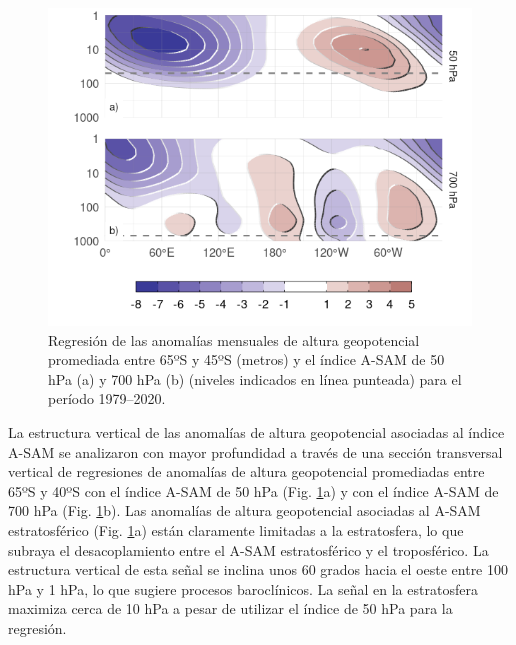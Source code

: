 \documentclass[12pt,oneside,a4paper]{reedthesis}
\begin{document}
\begin{figure}

{\centering \includegraphics{figures/30-sam/vertical-regression-1} 

}

\caption{Regresión de las anomalías mensuales de altura geopotencial promediada entre 65ºS y 45ºS (metros) y el índice A-SAM de 50 hPa (a) y 700 hPa (b) (niveles indicados en línea punteada) para el período 1979--2020.}\label{fig:vertical-regression}
\end{figure}

La estructura vertical de las anomalías de altura geopotencial asociadas al índice A-SAM se analizaron con mayor profundidad a través de una sección transversal vertical de regresiones de anomalías de altura geopotencial promediadas entre 65ºS y 40ºS con el índice A-SAM de 50 hPa (Fig. \ref{fig:vertical-regression}a) y con el índice A-SAM de 700 hPa (Fig. \ref{fig:vertical-regression}b).
Las anomalías de altura geopotencial asociadas al A-SAM estratosférico (Fig. \ref{fig:vertical-regression}a) están claramente limitadas a la estratosfera, lo que subraya el desacoplamiento entre el A-SAM estratosférico y el troposférico.
La estructura vertical de esta señal se inclina unos 60 grados hacia el oeste entre 100 hPa y 1 hPa, lo que sugiere procesos baroclínicos.
La señal en la estratosfera maximiza cerca de 10 hPa a pesar de utilizar el índice de 50 hPa para la regresión.
\end{document}
